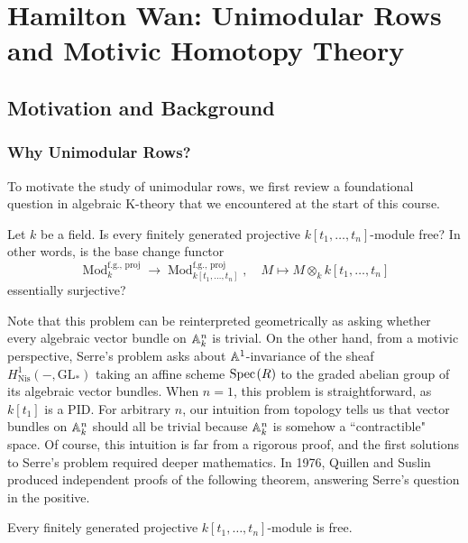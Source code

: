 \section{Hamilton Wan: Unimodular Rows and Motivic Homotopy Theory}

\subsection{Motivation and Background}

\subsubsection{Why Unimodular Rows?} 

To motivate the study of unimodular rows, we first review a foundational question in algebraic K-theory that we encountered at the start of this course. 

\begin{question}
    Let $k$ be a field. Is every finitely generated projective $k[t_1,\ldots,t_n]$-module free? In other words, is the base change functor \[\operatorname{Mod}_k^{\text{f.g., proj}} \to \operatorname{Mod}_{k[t_1,\ldots,t_n]}^{\text{f.g., proj}}, \quad M \mapsto M \otimes_k k[t_1,\ldots,t_n]\] essentially surjective?
\end{question}

Note that this problem can be reinterpreted geometrically as asking whether every algebraic vector bundle on $\mathbb{A}^n_k$ is trivial. On the other hand, from a motivic perspective, Serre's problem asks about $\mathbb{A}^1$-invariance of the sheaf $H^1_{\mathrm{Nis}}(-,\mathrm{GL}_*)$ taking an affine scheme $\text{Spec}\hspace{0.1em}(R)$ to the graded abelian group of its algebraic vector bundles. When $n = 1$, this problem is straightforward, as $k[t_1]$ is a PID. For arbitrary $n$, our intuition from topology tells us that vector bundles on $\mathbb{A}^n_k$ should all be trivial because $\mathbb{A}^n_k$ is somehow a ``contractible" space. Of course, this intuition is far from a rigorous proof, and the first solutions to Serre's problem required deeper mathematics. In 1976, Quillen \cite{Quillen76} and Suslin \cite{Suslin76} produced independent proofs of the following theorem, answering Serre's question in the positive.

\begin{theorem}
    Every finitely generated projective $k[t_1,\ldots,t_n]$-module is free.
\end{theorem}

